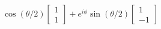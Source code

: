 \documentclass[preview]{standalone}
\begin{document}
\begin{center}
$\cos(\theta/2) \begin{bmatrix} 1 \\ 1\end{bmatrix} + e^{i\phi}\sin(\theta/2) \begin{bmatrix} 1 \\ -1\end{bmatrix}$
\end{center}
\end{document}
